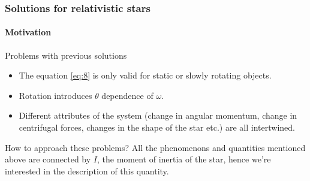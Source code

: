 \begin{frame}
\frametitle{Solutions for relativistic stars}
\framesubtitle{Motivation}

\begin{exampleblock}{Problems with previous solutions}
	\begin{itemize}
		\item The equation \eqref{eq:8} is only valid for static or slowly rotating objects.
		\item Rotation introduces $\theta$ dependence of $\omega$.
		\item Different attributes of the system (change in angular momentum, change in centrifugal forces, changes in the shape of the star etc.) are all intertwined.
	\end{itemize}
\end{exampleblock}

\begin{alertblock}{How to approach these problems?}
	All the phenomenons and quantities mentioned above are connected by $I$, the moment of inertia of the star, hence we're interested in the description of this quantity.
\end{alertblock}

\end{frame}
